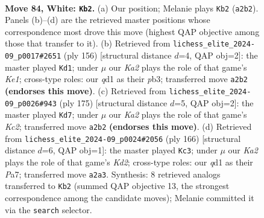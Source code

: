 \documentclass[11pt]{article}
\begin{document}
\clearpage

\begin{figure}[p]\centering
\begin{subfigure}{0.46\textwidth}\centering
\resizebox{\linewidth}{!}{%
\newchessgame
\chessboard[
  setfen={8/8/1p6/p7/2P1k3/8/K7/3q4 w - - 24 84},
  showmover=false,
  pgfstyle=straightmove, color=movearrow, markmove={a2-b2}
]}
\caption{}
\end{subfigure}\hfill
\begin{subfigure}{0.46\textwidth}\centering
\resizebox{\linewidth}{!}{%
\newchessgame
\chessboard[
  setfen={8/8/8/3k2p1/5pP1/1p6/8/4K3 w - - 0 79},
  showmover=false,
  pgfstyle=straightmove, color=movearrow, markmove={e1-d1}
]}
\caption{}
\end{subfigure}
\\[4pt]
\begin{subfigure}{0.46\textwidth}\centering
\resizebox{\linewidth}{!}{%
\newchessgame
\chessboard[
  setfen={8/2k5/p7/P2K4/1P6/8/8/8 b - - 14 88},
  showmover=false,
  pgfstyle=straightmove, color=movearrow, markmove={c7-d7}
]}
\caption{}
\end{subfigure}\hfill
\begin{subfigure}{0.46\textwidth}\centering
\resizebox{\linewidth}{!}{%
\newchessgame
\chessboard[
  setfen={8/P7/4k3/8/2p5/1p6/3K4/8 w - - 0 84},
  showmover=false,
  pgfstyle=straightmove, color=movearrow, markmove={d2-c3}
]}
\caption{}
\end{subfigure}
\caption{\textbf{Move 84, White: \texttt{Kb2}.} (a) Our position; Melanie plays \texttt{Kb2} (\texttt{a2b2}). Panels (b)--(d) are the retrieved master positions whose correspondence most drove this move (highest QAP objective among those that transfer to it). (b) Retrieved from \texttt{lichess\_elite\_2024-09\_p0017\#2651} (ply 156) [structural distance $d$=4, QAP obj=2]: the master played \texttt{Kd1}; under $\mu$ our \emph{Ka2} plays the role of that game's \emph{Ke1}; cross-type roles: our \emph{q}d1 as their \emph{p}b3; transferred move \texttt{a2b2} \textbf{(endorses this move)}. (c) Retrieved from \texttt{lichess\_elite\_2024-09\_p0026\#943} (ply 175) [structural distance $d$=5, QAP obj=2]: the master played \texttt{Kd7}; under $\mu$ our \emph{Ka2} plays the role of that game's \emph{Kc2}; transferred move \texttt{a2b2} \textbf{(endorses this move)}. (d) Retrieved from \texttt{lichess\_elite\_2024-09\_p0024\#2056} (ply 166) [structural distance $d$=6, QAP obj=1]: the master played \texttt{Kc3}; under $\mu$ our \emph{Ka2} plays the role of that game's \emph{Kd2}; cross-type roles: our \emph{q}d1 as their \emph{P}a7; transferred move \texttt{a2a3}. Synthesis: 8 retrieved analogs transferred to \texttt{Kb2} (summed QAP objective 13, the strongest correspondence among the candidate moves); Melanie committed it via the \texttt{search} selector.}
\label{fig:thought-m166}
\end{figure}
\end{document}
